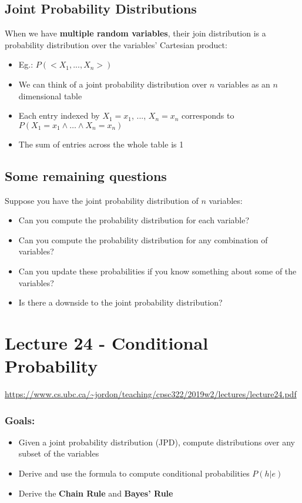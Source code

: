 \documentclass{article}
\def\blu#1{{\color{blu}#1}}
\begin{document}
\subsection*{Joint Probability Distributions}
When we have \textbf{multiple random variables}, their \blu{join distribution} is a probability distribution over the variables' Cartesian product:
\begin{itemize}
	\item Eg.: $ P(<X_1, ..., X_n > ) $
	\item We can think of a joint probability distribution over $ n $ variables as an $ n $ dimensional table
	\item Each entry indexed by $ X_1 = x_1 $, ..., $ X_n = x_n $ corresponds to $ P(X_1 = x_1 \land \dots \land X_n = x_n ) $
	\item The sum of entries across the whole table is 1
\end{itemize}

\subsection*{Some remaining questions}
Suppose you have the joint probability distribution of $ n $ variables:
\begin{itemize}
	\item Can you compute the probability distribution for each variable?
	\item Can you compute the probability distribution for any combination of variables?
	\item Can you update these probabilities if you know something about some of the variables?
	\item Is there a downside to the joint probability distribution?
\end{itemize}

\newpage

\section*{Lecture 24 - Conditional Probability}
\url{https://www.cs.ubc.ca/~jordon/teaching/cpsc322/2019w2/lectures/lecture24.pdf}
\subsubsection*{Goals:}
\begin{itemize}
	\item Given a joint probability distribution (JPD), compute distributions over any subset of the variables
	\item Derive and use the formula to compute conditional probabilities $ P(h|e) $
	\item Derive the \textbf{Chain Rule} and \textbf{Bayes’ Rule}
\end{itemize}
\end{document}
